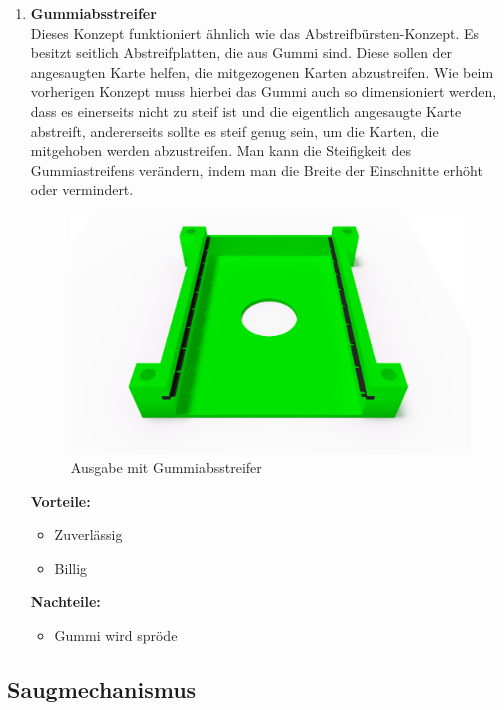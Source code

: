 \begin{enumerate}
    \item \textbf{Gummiabsstreifer}\\
    Dieses Konzept funktioniert ähnlich wie das Abstreifbürsten-Konzept.
    Es besitzt seitlich Abstreifplatten, die aus Gummi sind.
    Diese sollen der angesaugten Karte helfen, die mitgezogenen Karten abzustreifen.
    Wie beim vorherigen Konzept muss hierbei das Gummi auch so
    dimensioniert werden, dass es einerseits nicht zu steif ist und die eigentlich angesaugte Karte abstreift, andererseits sollte es steif genug sein, um die Karten, die mitgehoben werden abzustreifen.
    Man kann die Steifigkeit des Gummiastreifens verändern, indem man die Breite der Einschnitte
    erhöht oder vermindert.

    \begin{figure}[H]
        \centering
        \includegraphics[scale=0.4,page=1]{fig/mech/AusgabeMitGummiabstreifer}
        \caption{Ausgabe mit Gummiabsstreifer}
    \end{figure}

    \textbf{Vorteile:}
    \begin{itemize}
        \item Zuverlässig
        \item Billig
    \end{itemize}
    \textbf{Nachteile:}
    \begin{itemize}
        \item Gummi wird spröde
    \end{itemize}
\end{enumerate}

\subsection{Saugmechanismus}

